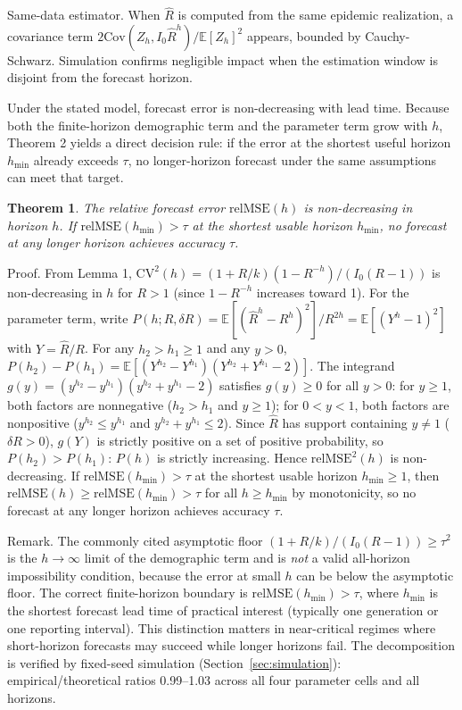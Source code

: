 \documentclass[review]{elsarticle}
\theoremstyle{plain}
\newtheorem{theorem}{Theorem}
\theoremstyle{definition}
\begin{document}
Same-data estimator. When $\hat{R}$ is computed from the same epidemic realization, a covariance term $2\text{Cov}(Z_h, I_0\hat{R}^h)/\mathbb{E}[Z_h]^2$ appears, bounded by Cauchy-Schwarz. Simulation confirms negligible impact when the estimation window is disjoint from the forecast horizon.

Under the stated model, forecast error is non-decreasing with lead time. Because both the finite-horizon demographic term and the parameter term grow with $h$, Theorem 2 yields a direct decision rule: if the error at the shortest useful horizon $h_{\min}$ already exceeds $\tau$, no longer-horizon forecast under the same assumptions can meet that target.

\begin{theorem}
The relative forecast error $\text{relMSE}(h)$ is non-decreasing in horizon $h$. If $\text{relMSE}(h_{\min}) > \tau$ at the shortest usable horizon $h_{\min}$, no forecast at any longer horizon achieves accuracy $\tau$.
\end{theorem}

Proof. From Lemma 1, $\text{CV}^2(h) = (1+R/k)(1-R^{-h})/(I_0(R-1))$ is non-decreasing in $h$ for $R > 1$ (since $1-R^{-h}$ increases toward 1). For the parameter term, write $P(h; R, \delta R) = \mathbb{E}[(\hat{R}^h - R^h)^2]/R^{2h} = \mathbb{E}[(Y^h - 1)^2]$ with $Y = \hat{R}/R$. For any $h_2 > h_1 \geq 1$ and any $y > 0$, $P(h_2) - P(h_1) = \mathbb{E}[(Y^{h_2} - Y^{h_1})(Y^{h_2} + Y^{h_1} - 2)]$. The integrand $g(y) = (y^{h_2} - y^{h_1})(y^{h_2} + y^{h_1} - 2)$ satisfies $g(y) \geq 0$ for all $y > 0$: for $y \geq 1$, both factors are nonnegative ($h_2 > h_1$ and $y \geq 1$); for $0 < y < 1$, both factors are nonpositive ($y^{h_2} \leq y^{h_1}$ and $y^{h_2} + y^{h_1} \leq 2$). Since $\hat{R}$ has support containing $y \neq 1$ ($\delta R > 0$), $g(Y)$ is strictly positive on a set of positive probability, so $P(h_2) > P(h_1)$: $P(h)$ is strictly increasing. Hence $\text{relMSE}^2(h)$ is non-decreasing. If $\text{relMSE}(h_{\min}) > \tau$ at the shortest usable horizon $h_{\min} \geq 1$, then $\text{relMSE}(h) \geq \text{relMSE}(h_{\min}) > \tau$ for all $h \geq h_{\min}$ by monotonicity, so no forecast at any longer horizon achieves accuracy $\tau$.

Remark. The commonly cited asymptotic floor $(1+R/k)/(I_0(R-1)) \geq \tau^2$ is the $h \to \infty$ limit of the demographic term and is \emph{not} a valid all-horizon impossibility condition, because the error at small $h$ can be below the asymptotic floor. The correct finite-horizon boundary is $\text{relMSE}(h_{\min}) > \tau$, where $h_{\min}$ is the shortest forecast lead time of practical interest (typically one generation or one reporting interval). This distinction matters in near-critical regimes where short-horizon forecasts may succeed while longer horizons fail. The decomposition is verified by fixed-seed simulation (Section~\ref{sec:simulation}): empirical/theoretical ratios 0.99--1.03 across all four parameter cells and all horizons.
\end{document}
